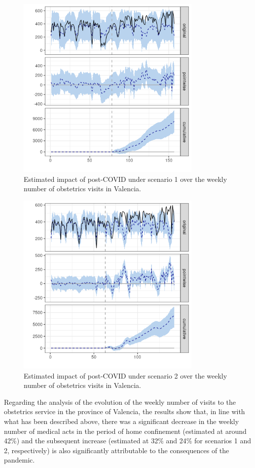 \documentclass[9pt]{osa-supplemental-document}
\begin{document}
\begin{center}
\begin{figure}[H]
\includegraphics[width=9cm]{obstetrics_post_scen1_Valencia.png}\caption{Estimated impact of post-COVID under scenario 1 over the weekly number of obstetrics visits in Valencia.}
\end{figure}
\end{center}

\begin{center}
  \begin{figure}[H]
    \includegraphics[width=9cm]{obstetrics_post_scen2_Valencia.png}\caption{Estimated impact of post-COVID under scenario 2 over the weekly number of obstetrics visits in Valencia.}
  \end{figure}
  \end{center}

  Regarding the analysis of the evolution of the weekly number of visits to the obstetrics service in the province of Valencia, the results show that, in line with what has been described above, there was a significant decrease in the weekly number of medical acts in the period of home confinement (estimated at around 42\%) and the subsequent increase (estimated at 32\% and 24\% for scenarios 1 and 2, respectively) is also significantly attributable to the consequences of the pandemic.

%
\end{document}
